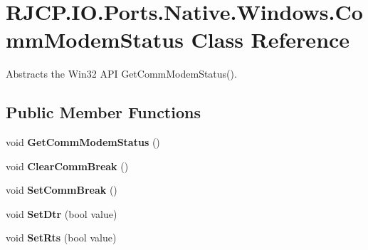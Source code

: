 \hypertarget{class_r_j_c_p_1_1_i_o_1_1_ports_1_1_native_1_1_windows_1_1_comm_modem_status}{}\section{R\+J\+C\+P.\+I\+O.\+Ports.\+Native.\+Windows.\+Comm\+Modem\+Status Class Reference}
\label{class_r_j_c_p_1_1_i_o_1_1_ports_1_1_native_1_1_windows_1_1_comm_modem_status}


Abstracts the Win32 A\+PI Get\+Comm\+Modem\+Status().  


\subsection*{Public Member Functions}
\begin{DoxyCompactItemize}
\item 
\mbox{\label{class_r_j_c_p_1_1_i_o_1_1_ports_1_1_native_1_1_windows_1_1_comm_modem_status_a017c9b2791ee2f273e81dc74d94e6940}} 
void {\bfseries Get\+Comm\+Modem\+Status} ()
\item 
\mbox{\label{class_r_j_c_p_1_1_i_o_1_1_ports_1_1_native_1_1_windows_1_1_comm_modem_status_a80219f71220fb5cd5aac90519cd60a29}} 
void {\bfseries Clear\+Comm\+Break} ()
\item 
\mbox{\label{class_r_j_c_p_1_1_i_o_1_1_ports_1_1_native_1_1_windows_1_1_comm_modem_status_a690f858da11a4f380b18847d7b0fa4a0}} 
void {\bfseries Set\+Comm\+Break} ()
\item 
\mbox{\label{class_r_j_c_p_1_1_i_o_1_1_ports_1_1_native_1_1_windows_1_1_comm_modem_status_a9f4e9535d8fc9de527b2e433193df431}} 
void {\bfseries Set\+Dtr} (bool value)
\item 
\mbox{\label{class_r_j_c_p_1_1_i_o_1_1_ports_1_1_native_1_1_windows_1_1_comm_modem_status_a4b92a94351c4d3b4cdd2afa3b6030af0}} 
void {\bfseries Set\+Rts} (bool value)
\end{DoxyCompactItemize}

